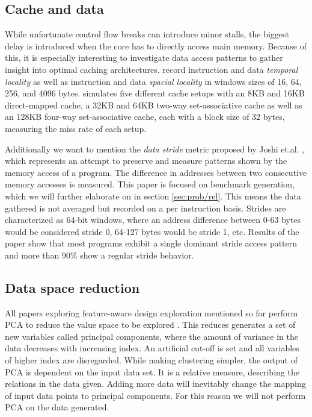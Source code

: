 \documentclass[../bachelor_paper.tex]{subfiles}
\begin{document}
\subsection{Cache and data}
While unfortunate control flow breaks can introduce minor stalls, the biggest delay is introduced when the core has to directly access main memory. Because of this, it is especially interesting to investigate data access patterns to gather insight into optimal caching architectures. \cite{phansalkarMeasuringProgramSimilarity2005,joshiMeasuringBenchmarkSimilarity2006} record instruction and data \emph{temporal locality} as well as instruction and data \emph{spacial locality} in windows sizes of 16, 64, 256, and 4096 bytes. \cite{eeckhoutQuantifyingImpactInput} simulates five different cache setups with an 8KB and 16KB direct-mapped cache, a 32KB and 64KB two-way set-associative cache as well as an 128KB four-way set-associative cache, each with a block size of 32 bytes, measuring the miss rate of each setup.

Additionally we want to mention the \emph{data stride} metric proposed by Joshi et.al. \cite{joshiDistillingEssenceProprietary2008}, which represents an attempt to preserve and measure patterns shown by the memory access of a program. The difference in addresses between two consecutive memory accesses is measured. This paper is focused on benchmark generation, which we will further elaborate on in section \ref{sec:prob/rel}. This means the data gathered is not averaged but recorded on a per instruction basis. Strides are characterized as 64-bit windows, where an address difference between 0-63 bytes would be considered stride 0, 64-127 bytes would be stride 1, etc. Results of the paper show that most programs exhibit a single dominant stride access pattern and more than 90\% show a regular stride behavior.

\subsection{Data space reduction}
All papers exploring feature-aware design exploration mentioned so far perform \acl{PCA} to reduce the value space to be explored \cite{phansalkarMeasuringProgramSimilarity2005,joshiMeasuringBenchmarkSimilarity2006,eeckhoutQuantifyingImpactInput}. This reduces generates a set of new variables called principal components, where the amount of variance in the data decreases with increasing index. An artificial cut-off is set and all variables of higher index are disregarded. While making clustering simpler, the output of \ac{PCA} is dependent on the input data set. It is a relative measure, describing the relations in the data given. Adding more data will inevitably change the mapping of input data points to principal components. For this reason we will not perform \ac{PCA} on the data generated.
\end{document}
